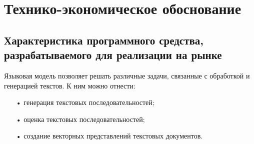 \newcommand{\byr}{Br}

\section{Технико-экономическое обоснование}













\subsection{Характеристика программного средства, разрабатываемого для реализации на рынке}
Языковая модель позволяет решать различные задачи, связанные с обработкой и генерацией текстов. К ним можно отнести:
\begin{itemize}
	\item[•] генерация текстовых последовательностей;
	\item[•] оценка текстовых последовательностей;
	\item[•] создание векторных представлений текстовых документов.
\end{itemize}

